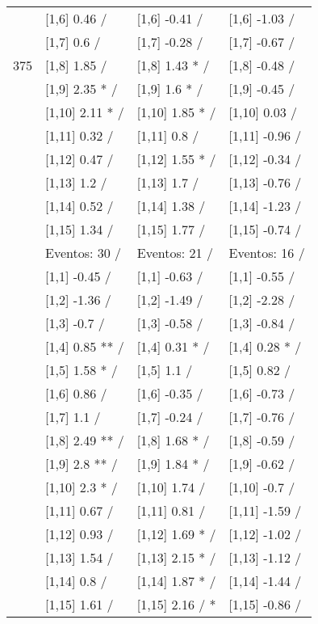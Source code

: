 \begin{table}
\begin{tabular}[t]{llll}
 & {}[1,6] 0.46  / & {}[1,6] -0.41  / & {}[1,6] -1.03  /\\
 & {}[1,7] 0.6  / & {}[1,7] -0.28  / & {}[1,7] -0.67  /\\
375 & {}[1,8] 1.85  / & {}[1,8] 1.43 * / & {}[1,8] -0.48  /\\
\addlinespace
 & {}[1,9] 2.35 * / & {}[1,9] 1.6 * / & {}[1,9] -0.45  /\\
 & {}[1,10] 2.11 * / & {}[1,10] 1.85 * / & {}[1,10] 0.03  /\\
 & {}[1,11] 0.32  / & {}[1,11] 0.8  / & {}[1,11] -0.96  /\\
 & {}[1,12] 0.47  / & {}[1,12] 1.55 * / & {}[1,12] -0.34  /\\
 & {}[1,13] 1.2  / & {}[1,13] 1.7  / & {}[1,13] -0.76  /\\
\addlinespace
 & {}[1,14] 0.52  / & {}[1,14] 1.38  / & {}[1,14] -1.23  /\\
 & {}[1,15] 1.34  / & {}[1,15] 1.77  / & {}[1,15] -0.74  /\\
 & Eventos:  30 / & Eventos:  21 / & Eventos:  16 /\\
 & {}[1,1] -0.45  / & {}[1,1] -0.63  / & {}[1,1] -0.55  /\\
 & {}[1,2] -1.36  / & {}[1,2] -1.49  / & {}[1,2] -2.28  /\\
\addlinespace
 & {}[1,3] -0.7  / & {}[1,3] -0.58  / & {}[1,3] -0.84  /\\
 & {}[1,4] 0.85 ** / & {}[1,4] 0.31 * / & {}[1,4] 0.28 * /\\
 & {}[1,5] 1.58 * / & {}[1,5] 1.1  / & {}[1,5] 0.82  /\\
 & {}[1,6] 0.86  / & {}[1,6] -0.35  / & {}[1,6] -0.73  /\\
 & {}[1,7] 1.1  / & {}[1,7] -0.24  / & {}[1,7] -0.76  /\\
\addlinespace
500 & {}[1,8] 2.49 ** / & {}[1,8] 1.68 * / & {}[1,8] -0.59  /\\
 & {}[1,9] 2.8 ** / & {}[1,9] 1.84 * / & {}[1,9] -0.62  /\\
 & {}[1,10] 2.3 * / & {}[1,10] 1.74  / & {}[1,10] -0.7  /\\
 & {}[1,11] 0.67  / & {}[1,11] 0.81  / & {}[1,11] -1.59  /\\
 & {}[1,12] 0.93  / & {}[1,12] 1.69 * / & {}[1,12] -1.02  /\\
\addlinespace
 & {}[1,13] 1.54  / & {}[1,13] 2.15 * / & {}[1,13] -1.12  /\\
 & {}[1,14] 0.8  / & {}[1,14] 1.87 * / & {}[1,14] -1.44  /\\
 & {}[1,15] 1.61  / & {}[1,15] 2.16  / * & {}[1,15] -0.86  /\\
\bottomrule
\end{tabular}
\end{table}

